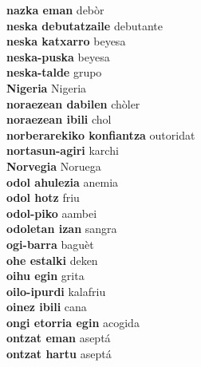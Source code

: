 \textbf{ nazka eman  } debòr \\
\textbf{ neska debutatzaile  } debutante \\
\textbf{ neska katxarro  } beyesa \\
\textbf{ neska-puska  } beyesa \\
\textbf{ neska-talde  } grupo \\
\textbf{ Nigeria  } Nigeria \\
\textbf{ noraezean dabilen  } chòler \\
\textbf{ noraezean ibili  } chol \\
\textbf{ norberarekiko konfiantza  } outoridat \\
\textbf{ nortasun-agiri  } karchi \\
\textbf{ Norvegia  } Noruega \\
\textbf{ odol ahulezia  } anemia \\
\textbf{ odol hotz  } friu \\
\textbf{ odol-piko  } aambei \\
\textbf{ odoletan izan  } sangra \\
\textbf{ ogi-barra  } baguèt \\
\textbf{ ohe estalki  } deken \\
\textbf{ oihu egin  } grita \\
\textbf{ oilo-ipurdi  } kalafriu \\
\textbf{ oinez ibili  } cana \\
\textbf{ ongi etorria egin  } acogida \\
\textbf{ ontzat eman  } aseptá \\
\textbf{ ontzat hartu  } aseptá \\
